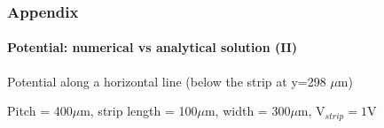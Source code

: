 \documentclass[14pt]{beamer}
\begin{document}
\begin{frame}
  \frametitle{Appendix}
  \framesubtitle{Potential: numerical vs analytical solution (II)}

  \fontsize{10pt}{7.2}\selectfont

  Potential along a horizontal line (below the strip at y=298 $\mu$m)

  Pitch = 400$\mu$m, strip length = 100$\mu$m, width = 300$\mu$m, V$_{strip} = 1$V

\vspace{-1.5em}

  \begin{columns}
      \begin{column}{0.5\textwidth}

        \begin{center}
        \end{center}
      \end{column}


\end{columns}
\end{frame}
\end{document}
